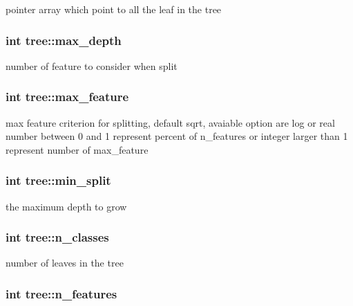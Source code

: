 pointer array which point to all the leaf in the tree \hypertarget{classtree_a0a9f968fac827d3239be67488c34fb21}{
\subsubsection[{max\+\_\+depth}]{\setlength{\rightskip}{0pt plus 5cm}int tree\+::max\+\_\+depth\hspace{0.3cm}{\ttfamily [protected]}}}\label{classtree_a0a9f968fac827d3239be67488c34fb21}
number of feature to consider when split \hypertarget{classtree_a6f4304318f8f091f7d783ac1ec7d2775}{
\subsubsection[{max\+\_\+feature}]{\setlength{\rightskip}{0pt plus 5cm}int tree\+::max\+\_\+feature\hspace{0.3cm}{\ttfamily [protected]}}}\label{classtree_a6f4304318f8f091f7d783ac1ec7d2775}
max feature criterion for splitting, default {\ttfamily sqrt}, avaiable option are {\ttfamily log} or real number between 0 and 1 represent percent of {\ttfamily n\+\_\+features} or integer larger than 1 represent number of {\ttfamily max\+\_\+feature} \hypertarget{classtree_ae70cd626c0b50a0b8306a94a9e5e8fd7}{
\subsubsection[{min\+\_\+split}]{\setlength{\rightskip}{0pt plus 5cm}int tree\+::min\+\_\+split\hspace{0.3cm}{\ttfamily [protected]}}}\label{classtree_ae70cd626c0b50a0b8306a94a9e5e8fd7}
the maximum depth to grow \hypertarget{classtree_a3f074099473facb464acf152157bf4d0}{
\subsubsection[{n\+\_\+classes}]{\setlength{\rightskip}{0pt plus 5cm}int tree\+::n\+\_\+classes\hspace{0.3cm}{\ttfamily [protected]}}}\label{classtree_a3f074099473facb464acf152157bf4d0}
number of leaves in the tree \hypertarget{classtree_a48430ab4447259c35af5f22e894e1d6c}{
\subsubsection[{n\+\_\+features}]{\setlength{\rightskip}{0pt plus 5cm}int tree\+::n\+\_\+features\hspace{0.3cm}{\ttfamily [protected]}}}\label{classtree_a48430ab4447259c35af5f22e894e1d6c}
